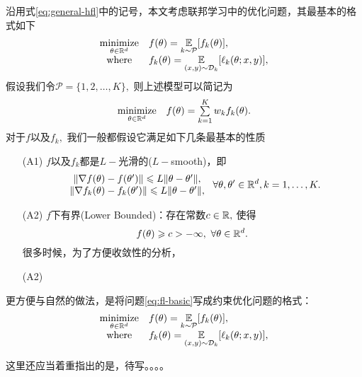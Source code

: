 沿用式\eqref{eq:general-hfl}中的记号，本文考虑联邦学习中的优化问题，其最基本的格式如下
\begin{equation}
\label{eq:fl-basic-dist}
\begin{array}{cl}
\operatorname*{minimize}\limits_{\theta \in \mathbb{R}^d} & f(\theta) = \operatorname*{\mathbb{E}}\limits_{k \sim {\mathcal{P}}} [f_k(\theta)], \\
\text{where} & f_k(\theta) = \operatorname*{\mathbb{E}}\limits_{(x, y) \sim \mathcal{D}_k} [\ell_k(\theta; x, y)],
\end{array}
\end{equation}
假设我们令$\mathcal{P} = \{1, 2, \ldots, K\},$ 则上述模型可以简记为
\begin{equation}
\label{eq:fl-basic}
\begin{array}{cl}
\operatorname*{minimize}\limits_{\theta \in \mathbb{R}^d} & f(\theta) = \sum\limits_{k=1}^K w_k f_k(\theta).
\end{array}
\end{equation}
对于$f$以及$f_k,$ 我们一般都假设它满足如下几条最基本的性质
\begin{itemize}
    \item[(A1)] $f$以及$f_k$都是$L-$光滑的($L-$smooth)，即
    \begin{equation}
    \label{eq:l-smooth}
    \begin{array}{c}
    \lVert \nabla f (\theta) - f (\theta') \rVert \leqslant L \lVert \theta - \theta' \rVert, \\
    \lVert \nabla f_k (\theta) - f_k (\theta') \rVert \leqslant L \lVert \theta - \theta' \rVert,
    \end{array}
    ~ \forall \theta, \theta' \in \mathbb{R}^d, k = 1, \ldots, K.
    \end{equation}
    \item[(A2)] $f$下有界(Lower Bounded)：存在常数$c \in \mathbb{R},$ 使得
    \begin{equation}
    \label{eq:lower-bounded}
    f(\theta) \geqslant c > -\infty, ~ \forall \theta \in \mathbb{R}^d.
    \end{equation}
    很多时候，为了方便收敛性的分析，
    \item[(A2)] 
\end{itemize}

更方便与自然的做法，是将问题\eqref{eq:fl-basic}写成约束优化问题的格式：
\begin{equation}
\label{eq:fl-basic-constraint}
\begin{array}{cl}
\begin{array}{cl}
\operatorname*{minimize}\limits_{\theta \in \mathbb{R}^d} & f(\theta) = \operatorname*{\mathbb{E}}\limits_{k \sim {\mathcal{P}}} [f_k(\theta)], \\
\text{where} & f_k(\theta) = \operatorname*{\mathbb{E}}\limits_{(x, y) \sim \mathcal{D}_k} [\ell_k(\theta; x, y)],
\end{array}
\end{array}
\end{equation}

这里还应当着重指出的是，待写。。。。
